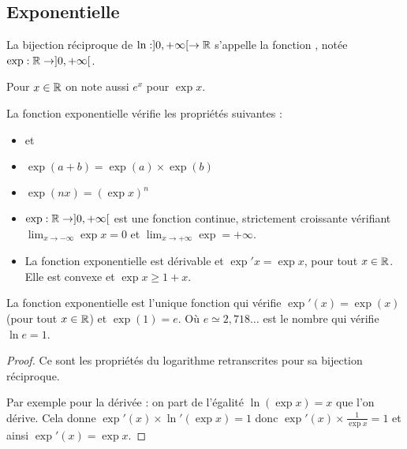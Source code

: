 \documentclass[class=report,crop=false]{standalone}
\begin{document}
\subsection{Exponentielle}

\begin{definition}
La bijection réciproque de $\ln : ]0,+\infty[ \to \mathbb{R}$ s'appelle la
fonction , notée $\exp : \mathbb{R} \to   ]0,+\infty[$.
\end{definition}




Pour $x \in \mathbb{R}$ on note aussi $e^x$ pour $\exp x$.

\begin{proposition}
La fonction exponentielle vérifie les propriétés suivantes :
\begin{itemize}
  \item {} et

  \item $\exp(a+b) = \exp(a) \times \exp(b)$

  \item $\exp(nx) = (\exp x)^n$

  \item $\exp : \mathbb{R} \to   ]0,+ \infty[$ est une fonction continue, strictement croissante vérifiant
$\lim_{x\to-\infty} \exp x = 0$ et $\lim_{x\to +\infty} \exp = +\infty$.

  \item La fonction exponentielle est dérivable et $\exp' x = \exp x$, pour tout $x\in \mathbb{R}$. 
  Elle est convexe et $\exp x \ge 1+x$.
\end{itemize}

\end{proposition}

\begin{remarque*}
La fonction exponentielle est l'unique fonction qui vérifie
$\exp'(x) = \exp(x)$ (pour tout $x\in \mathbb{R}$)
et $\exp(1) = e$. Où $e \simeq 2,718\ldots$ est le nombre qui vérifie $\ln e = 1$.
\end{remarque*}



\begin{proof}
Ce sont les propriétés du logarithme retranscrites pour sa bijection réciproque.

Par exemple pour la dérivée : on part de l'égalité $\ln(\exp x)=x$ que l'on dérive.
Cela donne $\exp'(x) \times \ln'(\exp x) = 1$ donc $\exp'(x) \times \frac{1}{\exp x} = 1$
et ainsi $\exp'(x) = \exp x$.
\end{proof}
\end{document}
